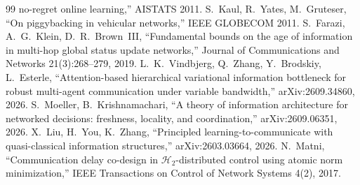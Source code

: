 \documentclass[11pt]{article}
\theoremstyle{definition}
\begin{document}
\begin{thebibliography}{99}
no-regret online learning,'' AISTATS 2011.
 S.~Kaul, R.~Yates, M.~Gruteser, ``On piggybacking in vehicular networks,'' IEEE GLOBECOM 2011.
 S.~Farazi, A.~G.~Klein, D.~R.~Brown~III, ``Fundamental bounds on the age of information in multi-hop
global status update networks,'' Journal of Communications and Networks 21(3):268--279, 2019.
 L.~K.~Vindbjerg, Q.~Zhang, Y.~Brodskiy, L.~Esterle, ``Attention-based hierarchical variational information
bottleneck for robust multi-agent communication under variable bandwidth,'' arXiv:2609.34860, 2026.
 S.~Moeller, B.~Krishnamachari, ``A theory of information architecture for networked decisions:
freshness, locality, and coordination,'' arXiv:2609.06351, 2026.
 X.~Liu, H.~You, K.~Zhang, ``Principled learning-to-communicate with quasi-classical information
structures,'' arXiv:2603.03664, 2026.
 N.~Matni, ``Communication delay co-design in $\mathcal{H}_2$-distributed control using atomic norm
minimization,'' IEEE Transactions on Control of Network Systems 4(2), 2017.
\end{thebibliography}
\end{document}
